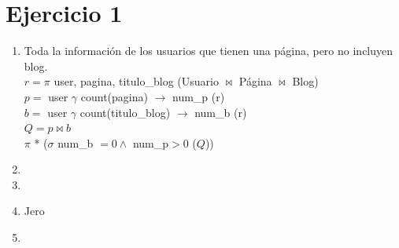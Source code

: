 \documentclass[a4paper, 12pt]{report}
\begin{document}
\section*{Ejercicio 1}{
\begin{enumerate}[label=\alph*)]
\item{Toda la información de los usuarios que tienen una página, pero no
        incluyen blog.\\
    $r = \pi$ user,  pagina, titulo\_blog (Usuario $\Join$ Página $\Join$ Blog)\\
    $p = $ user $\gamma$ count(pagina) $\rightarrow$ num\_p (r)\\
    $b = $ user $\gamma$ count(titulo\_blog) $\rightarrow$ num\_b (r)\\
    $Q = p \Join b$\\
    $\pi$ * ($\sigma$ num\_b $= 0 \wedge$ num\_p$ > 0$ ($Q$))
    }
\item{}
\item{}
\item{Jero}
\item{}
\end{enumerate}
}
\end{document}
